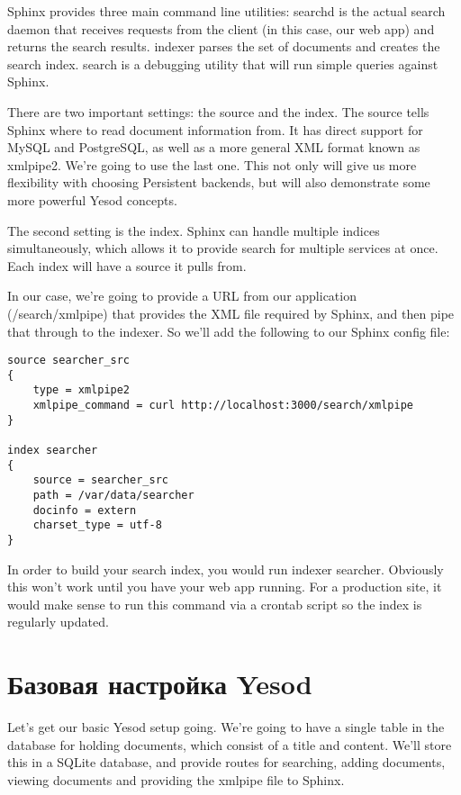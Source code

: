 Sphinx provides three main command line utilities: searchd is the actual search daemon that receives requests from the client (in this case, our web app) and returns the search results. indexer parses the set of documents and creates the search index. search is a debugging utility that will run simple queries against Sphinx.

There are two important settings: the source and the index. The source tells Sphinx where to read document information from. It has direct support for MySQL and PostgreSQL, as well as a more general XML format known as xmlpipe2. We're going to use the last one. This not only will give us more flexibility with choosing Persistent backends, but will also demonstrate some more powerful Yesod concepts.

The second setting is the index. Sphinx can handle multiple indices simultaneously, which allows it to provide search for multiple services at once. Each index will have a source it pulls from.

In our case, we're going to provide a URL from our application (/search/xmlpipe) that provides the XML file required by Sphinx, and then pipe that through to the indexer. So we'll add the following to our Sphinx config file:

\begin{lstlisting}
source searcher_src
{
    type = xmlpipe2
    xmlpipe_command = curl http://localhost:3000/search/xmlpipe
}

index searcher
{
    source = searcher_src
    path = /var/data/searcher
    docinfo = extern
    charset_type = utf-8
}
\end{lstlisting}

In order to build your search index, you would run indexer searcher. Obviously this won't work until you have your web app running. For a production site, it would make sense to run this command via a crontab script so the index is regularly updated.

\section{Базовая настройка Yesod} %

Let's get our basic Yesod setup going. We're going to have a single table in the database for holding documents, which consist of a title and content. We'll store this in a SQLite database, and provide routes for searching, adding documents, viewing documents and providing the xmlpipe file to Sphinx.

